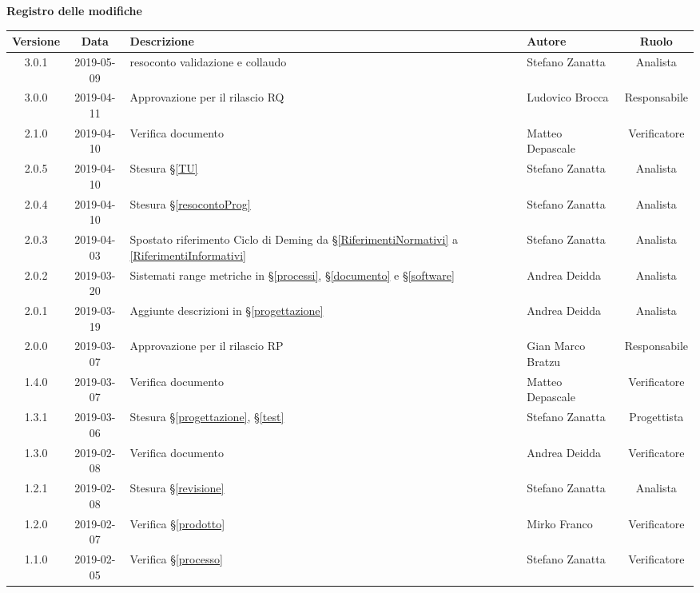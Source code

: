 	\begin{center}
		\textbf{Registro delle modifiche}
	\end{center}
	\begin{center}
		\begin{tabularx}{\textwidth}{|c|c|X|X|c|}
			\hline
			\textbf{Versione} & \textbf{Data} & \textbf{Descrizione} & \textbf{Autore} & \textbf{Ruolo} \\\hline
			\hline
			3.0.1 & 2019-05-09 &  resoconto validazione e collaudo & Stefano Zanatta & Analista \\
			\hline
			3.0.0 & 2019-04-11 &  Approvazione per il rilascio RQ & Ludovico Brocca & Responsabile \\
			\hline
			2.1.0 & 2019-04-10 &  Verifica documento & Matteo Depascale & Verificatore \\
			\hline
			2.0.5 & 2019-04-10 &  Stesura  \S\ref{TU} & Stefano Zanatta & Analista \\
			\hline
			2.0.4 & 2019-04-10 &  Stesura  \S\ref{resocontoProg} & Stefano Zanatta & Analista \\
			\hline
			2.0.3 & 2019-04-03 & Spostato riferimento Ciclo di Deming da \S\ref{RiferimentiNormativi} a \ref{RiferimentiInformativi} & Stefano Zanatta & Analista \\
			\hline
			2.0.2 & 2019-03-20 &  Sistemati range metriche in \S\ref{processi}, \S\ref{documento} e \S\ref{software} & Andrea Deidda & Analista \\
			\hline
			2.0.1 & 2019-03-19 &  Aggiunte descrizioni in \S\ref{progettazione} & Andrea Deidda & Analista \\
			\hline
			2.0.0 & 2019-03-07 &  Approvazione per il rilascio RP & Gian Marco Bratzu & Responsabile \\
			\hline
			1.4.0 & 2019-03-07 &  Verifica documento & Matteo Depascale & Verificatore \\
			\hline
			1.3.1 & 2019-03-06 &  Stesura \S\ref{progettazione}, \S\ref{test} & Stefano Zanatta & Progettista \\
			\hline
			1.3.0 & 2019-02-08 &  Verifica documento & Andrea Deidda & Verificatore \\
			\hline
			1.2.1 & 2019-02-08 &  Stesura \S\ref{revisione} & Stefano Zanatta & Analista \\
			\hline
			1.2.0 & 2019-02-07 & Verifica \S\ref{prodotto} & Mirko Franco & Verificatore \\
			\hline
			1.1.0 & 2019-02-05 & Verifica \S\ref{processo}& Stefano Zanatta & Verificatore\\

\end{tabularx}
\end{center}
